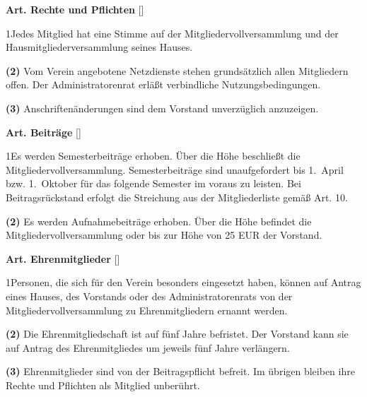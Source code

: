 \documentclass[12pt]{article}
\newcommand{\Satz}[2]{

\begin{samepage}
{\bf (#1)} #2
\end{samepage}
}
\newenvironment{Artikel}[2]{
\bigskip \centerline{{\bf Art. #1} [#2]}
\nopagebreak
}{
}
\begin{document}
\begin{Artikel}{7}{Rechte und Pflichten}

\Satz{1}{Jedes Mitglied hat eine Stimme auf der Mitgliedervollversammlung und
der Hausmitgliederversammlung seines Hauses.}

\Satz{2}{Vom Verein angebotene Netzdienste stehen grundsätzlich allen
Mitgliedern offen. Der Administratorenrat erläßt verbindliche
Nutzungsbedingungen.}

\Satz{3}{Anschriftenänderungen sind dem Vorstand unverzüglich anzuzeigen.}

\end{Artikel}


\begin{Artikel}{8}{Beiträge}

\Satz{1}{Es werden Semesterbeiträge erhoben. Über die Höhe beschließt die
Mitgliedervollversammlung. Semesterbeiträge sind unaufgefordert bis \mbox{1.
April} bzw. \mbox{1. Oktober} für das folgende Semester im voraus zu leisten.
Bei Beitragsrückstand erfolgt die Streichung aus der Mitgliederliste gemäß Art.
10.}

\Satz{2}{Es werden Aufnahmebeiträge erhoben. Über die Höhe befindet die
Mitgliedervollversammlung oder bis zur Höhe von 25 EUR der Vorstand.}

\end{Artikel}

\begin{Artikel}{9}{Ehrenmitglieder}

\Satz{1}{Personen, die sich für den Verein besonders eingesetzt haben, können
auf Antrag eines Hauses, des Vorstands oder des Administratorenrats von der
Mitgliedervollversammlung zu Ehrenmitgliedern ernannt werden.}

\Satz{2}{Die Ehrenmitgliedschaft ist auf fünf Jahre befristet. Der Vorstand
kann sie auf Antrag des Ehrenmitgliedes um jeweils fünf Jahre verlängern.}

\Satz{3}{Ehrenmitglieder sind von der Beitragspflicht befreit. Im übrigen
bleiben ihre Rechte und Pflichten als Mitglied unberührt.}

\end{Artikel}
\end{document}
